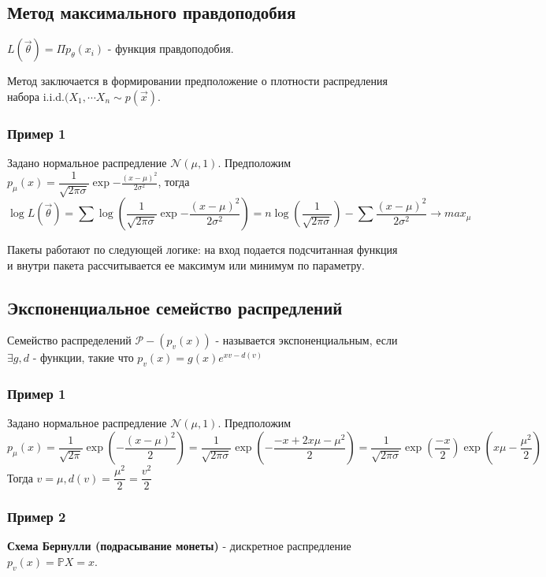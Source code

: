 \documentclass[a4 paper]{article}
\begin{document}
\subsection{Метод максимального правдоподобия}
\begin{defin}
$L(\overrightarrow{\theta}) = \Pi p_{\theta}(x_i)$ - функция правдоподобия.
\end{defin}
Метод заключается в формировании предположение о плотности распредления набора i.i.d.$(X_1, \cdots X_n \sim p(\overrightarrow{x})$. 

\subsubsection*{Пример 1}
Задано нормальное распредление $\mathcal{N}(\mu, 1)$. Предположим $p_{\mu}(x) = \dfrac{1}{\sqrt{2\pi\sigma}} \exp{- \frac{(x-\mu)^2}{2\sigma^2}}$, тогда 
$$
\log L(\overrightarrow{\theta}) = \sum \log \left( \dfrac{1}{\sqrt{2\pi\sigma}} \exp{- \frac{(x-\mu)^2}{2\sigma^2}} \right) = n \log \left( \dfrac{1}{\sqrt{2\pi\sigma}}\right) - \sum \frac{(x-\mu)^2}{2\sigma^2} \rightarrow max_{\mu}
$$

\begin{remark}
Пакеты работают по следующей логике: на вход подается подсчитанная функция и внутри пакета рассчитывается ее максимум или минимум по параметру.
\end{remark}

\subsection{Экспоненциальное семейство распредлений}
\begin{defin}
Семейство распределений $\mathcal{P} - (p_{v}(x))$ - называется экспоненциальным, если $\exists g,d$ - функции, такие что $p_v(x) = g(x) e^{xv - d(v)}$
\end{defin}

\subsubsection*{Пример 1}
Задано нормальное распредление $\mathcal{N}(\mu, 1)$. Предположим $$
p_{\mu}(x) = \dfrac{1}{\sqrt{2\pi}} \exp{(- \frac{(x-\mu)^2}{2})} = \dfrac{1}{\sqrt{2\pi\sigma}} \exp{(- \frac{-x +2x\mu - \mu^2}{2})} = \dfrac{1}{\sqrt{2\pi\sigma}} \exp{(\frac{-x}{2})} \exp{(x\mu - \frac{\mu^2}{2})} 
$$
Тогда $v = \mu, d(v) = \dfrac{\mu^2}{2} = \dfrac{v^2}{2}$

\subsubsection*{Пример 2}
\textbf{Схема Бернулли (подрасывание монеты)} - дискретное распредление $p_v(x) = \mathbb{P}{X = x}$.
\end{document}
